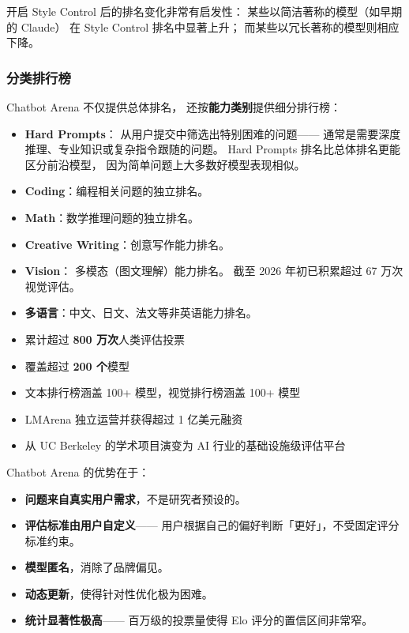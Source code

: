 开启 Style Control 后的排名变化非常有启发性：
某些以简洁著称的模型（如早期的 Claude）
在 Style Control 排名中显著上升；
而某些以冗长著称的模型则相应下降。

\subsubsection{分类排行榜}

Chatbot Arena 不仅提供总体排名，
还按\textbf{能力类别}提供细分排行榜：
\begin{itemize}[noitemsep]
  \item \textbf{Hard Prompts}：
        从用户提交中筛选出特别困难的问题——
        通常是需要深度推理、专业知识或复杂指令跟随的问题。
        Hard Prompts 排名比总体排名更能区分前沿模型，
        因为简单问题上大多数好模型表现相似。
  \item \textbf{Coding}：编程相关问题的独立排名。
  \item \textbf{Math}：数学推理问题的独立排名。
  \item \textbf{Creative Writing}：创意写作能力排名。
  \item \textbf{Vision}：
        多模态（图文理解）能力排名。
        截至 2026 年初已积累超过 67 万次视觉评估。
  \item \textbf{多语言}：中文、日文、法文等非英语能力排名。
\end{itemize}

\begin{corebox}
\begin{itemize}[noitemsep]
  \item 累计超过 \textbf{800 万次}人类评估投票
  \item 覆盖超过 \textbf{200 个}模型
  \item 文本排行榜涵盖 100+ 模型，视觉排行榜涵盖 100+ 模型
  \item LMArena 独立运营并获得超过 1 亿美元融资
  \item 从 UC Berkeley 的学术项目演变为
        AI 行业的基础设施级评估平台
\end{itemize}
\end{corebox}

Chatbot Arena 的优势在于：
\begin{itemize}[noitemsep]
  \item \textbf{问题来自真实用户需求}，不是研究者预设的。
  \item \textbf{评估标准由用户自定义}——
        用户根据自己的偏好判断「更好」，不受固定评分标准约束。
  \item \textbf{模型匿名}，消除了品牌偏见。
  \item \textbf{动态更新}，使得针对性优化极为困难。
  \item \textbf{统计显著性极高}——
        百万级的投票量使得 Elo 评分的置信区间非常窄。
\end{itemize}

